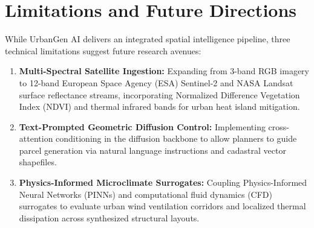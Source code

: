 \documentclass[journal]{IEEEtran}
\begin{document}
\section{Limitations and Future Directions}
While UrbanGen AI delivers an integrated spatial intelligence pipeline, three technical limitations suggest future research avenues:
\begin{enumerate}
    \item \textbf{Multi-Spectral Satellite Ingestion:} Expanding from 3-band RGB imagery to 12-band European Space Agency (ESA) Sentinel-2 and NASA Landsat surface reflectance streams, incorporating Normalized Difference Vegetation Index (NDVI) and thermal infrared bands for urban heat island mitigation.
    \item \textbf{Text-Prompted Geometric Diffusion Control:} Implementing cross-attention conditioning in the diffusion backbone to allow planners to guide parcel generation via natural language instructions and cadastral vector shapefiles.
    \item \textbf{Physics-Informed Microclimate Surrogates:} Coupling Physics-Informed Neural Networks (PINNs) and computational fluid dynamics (CFD) surrogates to evaluate urban wind ventilation corridors and localized thermal dissipation across synthesized structural layouts.
\end{enumerate}
\end{document}
